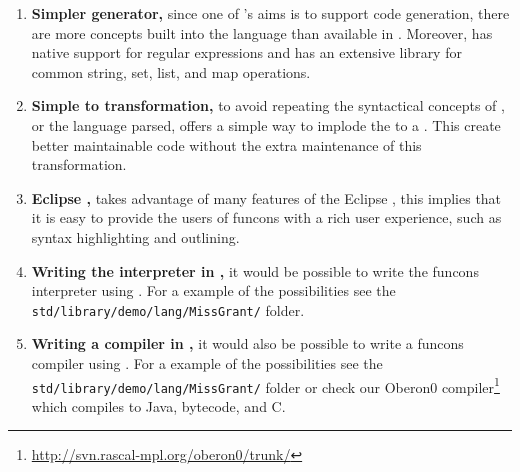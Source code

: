 \documentclass[a4paper, oneside, notitlepage]{article}
\newcommand{\CSF}{\textsmaller{CSF}\xspace}
\newcommand{\ASFSDF}{\textsmaller{ASF\hspace{-.05em}\raisebox{.4ex}{\tiny\textbf{+}}SDF}\xspace}
\newcommand{\AST}{\textsmaller{AST}\xspace}
\newcommand{\CST}{\textsmaller{CST}\xspace}
\newcommand{\IDE}{\textsmaller{IDE}\xspace}
\newcommand{\JVM}{\textsmaller{JVM}\xspace}
\newcommand{\filename}[1]{\texttt{#1}\xspace}
\begin{document}
\begin{enumerate}
	\newcommand{\advantage}[2]{\item \textbf{#1,} #2}

	\advantage
		{Simpler generator}
		{
			since one of \Rascal's aims is to support code generation, there are
			more concepts built into the language than available in \ASFSDF.
			Moreover, \Rascal has native support for regular
			expressions and has an extensive library for common string, set,
			list, and map operations.
		}

	\advantage
		{Simple \CST to \AST transformation}
		{
			to avoid repeating the syntactical concepts of \CSF, or the language
			parsed, \Rascal offers a simple way to implode the \CST to a \AST.
			This create better maintainable code without the extra maintenance
			of this transformation.
		}

	\advantage
		{Eclipse \IDE}
		{
			\Rascal takes advantage of many features of the Eclipse \IDE, this
			implies that it is easy to provide the users of funcons with a rich
			user experience, such as syntax highlighting and outlining.
		}

	\advantage
		{Writing the interpreter in \Rascal}
		{
			it would be possible to write the funcons interpreter using \Rascal.
			For a example of the possibilities see the
			\filename{std/library/demo/lang/MissGrant/} folder.
		}

	\advantage
		{Writing a compiler in \Rascal}
		{
			it would also be possible to write a funcons compiler using \Rascal.
			For a example of the possibilities see the
			\filename{std/library/demo/lang/MissGrant/} folder or check our
			Oberon0
			compiler\footnote{\url{http://svn.rascal-mpl.org/oberon0/trunk/}}
			which compiles to Java, \JVM bytecode, and C.
		}
\end{enumerate}
\end{document}
